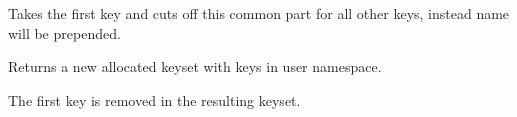Takes the first key and cuts off this common part for all other keys, instead name will be prepended. 

\begin{DoxyReturn}{Returns}
a new allocated keyset with keys in user namespace.
\end{DoxyReturn}
The first key is removed in the resulting keyset. 